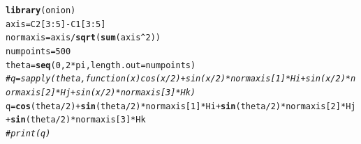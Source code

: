 \documentclass{article}\usepackage[]{graphicx}\usepackage[]{color}
\makeatletter
\newcommand{\hlnum}[1]{\textcolor[rgb]{0.686,0.059,0.569}{#1}}%
\newcommand{\hlcom}[1]{\textcolor[rgb]{0.678,0.584,0.686}{\textit{#1}}}%
\newcommand{\hlopt}[1]{\textcolor[rgb]{0,0,0}{#1}}%
\newcommand{\hlstd}[1]{\textcolor[rgb]{0.345,0.345,0.345}{#1}}%
\newcommand{\hlkwb}[1]{\textcolor[rgb]{0.69,0.353,0.396}{#1}}%
\newcommand{\hlkwc}[1]{\textcolor[rgb]{0.333,0.667,0.333}{#1}}%
\newcommand{\hlkwd}[1]{\textcolor[rgb]{0.737,0.353,0.396}{\textbf{#1}}}%
\newenvironment{kframe}{%
 \def\at@end@of@kframe{}%
 \ifinner\ifhmode%
  \def\at@end@of@kframe{\end{minipage}}%
  \begin{minipage}{\columnwidth}%
 \fi\fi%
 \def\FrameCommand##1{\hskip\@totalleftmargin \hskip-\fboxsep
 \colorbox{shadecolor}{##1}\hskip-\fboxsep
     \hskip-\linewidth \hskip-\@totalleftmargin \hskip\columnwidth}%
 \MakeFramed {\advance\hsize-\width
   \@totalleftmargin\z@ \linewidth\hsize
   \@setminipage}}%
 {\par\unskip\endMakeFramed%
 \at@end@of@kframe}
\newenvironment{knitrout}{}{} %
\makeatother
\begin{document}
\begin{knitrout}
\color{fgcolor}\begin{kframe}
\begin{alltt}
  \hlkwd{library}\hlstd{(onion)}
  \hlstd{axis} \hlkwb{=} \hlstd{C2[}\hlnum{3}\hlopt{:}\hlnum{5}\hlstd{]}\hlopt{-}\hlstd{C1[}\hlnum{3}\hlopt{:}\hlnum{5}\hlstd{]}
  \hlstd{normaxis} \hlkwb{=} \hlstd{axis}\hlopt{/}\hlkwd{sqrt}\hlstd{(}\hlkwd{sum}\hlstd{(axis}\hlopt{^}\hlnum{2}\hlstd{))}
  \hlstd{numpoints} \hlkwb{=} \hlnum{500}
  \hlstd{theta} \hlkwb{=} \hlkwd{seq}\hlstd{(}\hlnum{0}\hlstd{,}\hlnum{2}\hlopt{*}\hlstd{pi,}\hlkwc{length.out} \hlstd{= numpoints)}
  \hlcom{#q = sapply(theta,function(x) cos(x/2)+sin(x/2)*normaxis[1]*Hi+sin(x/2)*normaxis[2]*Hj+sin(x/2)*normaxis[3]*Hk)}
  \hlstd{q} \hlkwb{=} \hlkwd{cos}\hlstd{(theta}\hlopt{/}\hlnum{2}\hlstd{)}\hlopt{+}\hlkwd{sin}\hlstd{(theta}\hlopt{/}\hlnum{2}\hlstd{)}\hlopt{*}\hlstd{normaxis[}\hlnum{1}\hlstd{]}\hlopt{*}\hlstd{Hi}\hlopt{+}\hlkwd{sin}\hlstd{(theta}\hlopt{/}\hlnum{2}\hlstd{)}\hlopt{*}\hlstd{normaxis[}\hlnum{2}\hlstd{]}\hlopt{*}\hlstd{Hj}\hlopt{+}\hlkwd{sin}\hlstd{(theta}\hlopt{/}\hlnum{2}\hlstd{)}\hlopt{*}\hlstd{normaxis[}\hlnum{3}\hlstd{]}\hlopt{*}\hlstd{Hk}
  \hlcom{#print(q)}
\end{alltt}
\end{kframe}
\end{knitrout}
\end{document}
